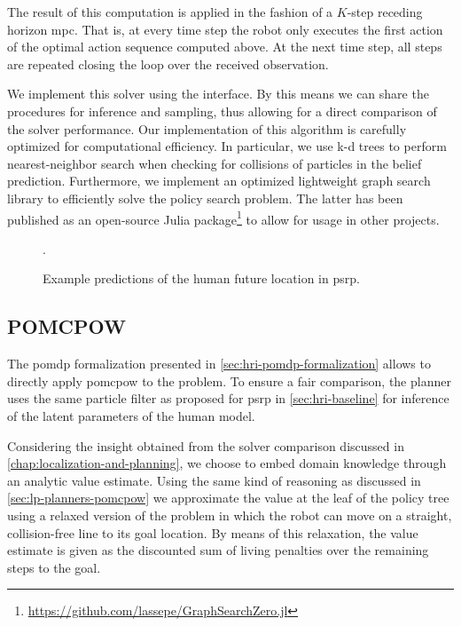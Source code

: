 The result of this computation is applied in the fashion of a $K$-step receding
horizon \ac{mpc}. That is, at every time step the robot only executes the first
action of the optimal action sequence computed above. At the next time step,
all steps are repeated closing the loop over the received observation.

We implement this solver using the \pomdpsjl interface. By this means we can
share the procedures for inference and sampling, thus allowing for a direct
comparison of the solver performance. Our implementation of this algorithm is
carefully optimized for computational efficiency. In particular, we use k-d
trees to perform nearest-neighbor search when checking for collisions of
particles in the belief prediction. Furthermore, we implement an optimized
lightweight graph search library to efficiently solve the policy search
problem. The latter has been published as an open-source Julia
package\footnote{\url{https://github.com/lassepe/GraphSearchZero.jl}} to allow
for usage in other projects.

\begin{figure}[htpb]
  \centering
  .
  \caption{Example predictions of the human future location in \acf{psrp}.}
  \label{fig:psrp-prediction-example}
\end{figure}

\subsection{POMCPOW}\label{sec:hri-planners}

The \ac{pomdp} formalization presented in \cref{sec:hri-pomdp-formalization}
allows to directly apply \ac{pomcpow} to the problem. To ensure a fair
comparison, the planner uses the same particle filter as proposed for \ac{psrp}
in \cref{sec:hri-baseline} for inference of the latent parameters of the human model.

Considering the insight obtained from the solver comparison discussed in
\cref{chap:localization-and-planning}, we choose to embed domain knowledge
through an analytic value estimate. Using the same kind of reasoning as
discussed in \cref{sec:lp-planners-pomcpow} we approximate the value at the
leaf of the policy tree using a relaxed version of the problem in which the
robot can move on a straight, collision-free line to its goal location. By
means of this relaxation, the value estimate is given as the discounted sum of
living penalties over the remaining steps to the goal.

